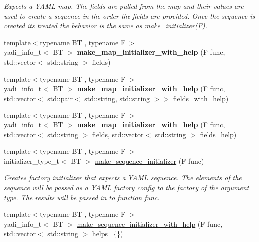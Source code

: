 \begin{DoxyCompactItemize}
\begin{DoxyCompactList}\small\item\em Expects a Y\+A\+ML map. The fields are pulled from the map and their values are used to create a sequence in the order the fields are provided. Once the sequence is created it\textquotesingle{}s treated the behavior is the same as make\+\_\+initializer(\+F). \end{DoxyCompactList}\item 
\mbox{\label{namespaceyadi_ad3b75d9038a0e5b77482456af2311b0d}} 
{\footnotesize template$<$typename BT , typename F $>$ }\\yadi\+\_\+info\+\_\+t$<$ BT $>$ {\bfseries make\+\_\+map\+\_\+initializer\+\_\+with\+\_\+help} (F func, std\+::vector$<$ std\+::string $>$ fields)
\item 
\mbox{\label{namespaceyadi_acc00952238c78dc6fbfc89bfe6deb8ee}} 
{\footnotesize template$<$typename BT , typename F $>$ }\\yadi\+\_\+info\+\_\+t$<$ BT $>$ {\bfseries make\+\_\+map\+\_\+initializer\+\_\+with\+\_\+help} (F func, std\+::vector$<$ std\+::pair$<$ std\+::string, std\+::string $>$$>$ fields\+\_\+with\+\_\+help)
\item 
\mbox{\label{namespaceyadi_aa63cb736dc5f8cbf6f6aad126825ab3d}} 
{\footnotesize template$<$typename BT , typename F $>$ }\\yadi\+\_\+info\+\_\+t$<$ BT $>$ {\bfseries make\+\_\+map\+\_\+initializer\+\_\+with\+\_\+help} (F func, std\+::vector$<$ std\+::string $>$ fields, std\+::vector$<$ std\+::string $>$ fields\+\_\+help)
\item 
{\footnotesize template$<$typename BT , typename F $>$ }\\initializer\+\_\+type\+\_\+t$<$ BT $>$ \hyperlink{namespaceyadi_ac81e360a765ce7e454fa3971f1f06cdd}{make\+\_\+sequence\+\_\+initializer} (F func)
\begin{DoxyCompactList}\small\item\em Creates factory initializer that expects a Y\+A\+ML sequence. The elements of the sequence will be passed as a Y\+A\+ML factory config to the factory of the argument type. The results will be passed in to function func. \end{DoxyCompactList}\item 
{\footnotesize template$<$typename BT , typename F $>$ }\\yadi\+\_\+info\+\_\+t$<$ BT $>$ \hyperlink{namespaceyadi_aba056e293eb266e6ae286c6480ebe667}{make\+\_\+sequence\+\_\+initializer\+\_\+with\+\_\+help} (F func, std\+::vector$<$ std\+::string $>$ helps=\{\})
$$
\end{DoxyCompactItemize}
